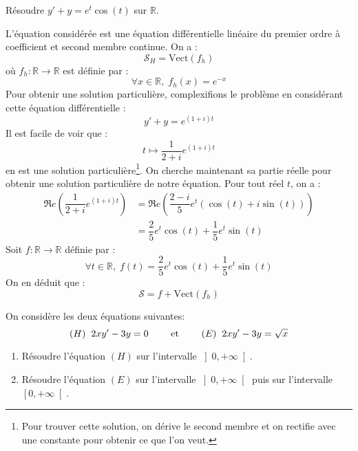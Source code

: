\documentclass[a4paper,10pt]{report}
\begin{document}
\begin{Exa} Résoudre $y'+y = e^t \cos(t)$ sur $\mathbb{R}$.
\end{Exa}

\corr L'équation considérée est une équation différentielle linéaire du premier ordre à coefficient et second membre continue. On a :
$$ \mathcal{S}_H = \textrm{Vect}(f_h)$$
où $f_h : \mathbb{R} \rightarrow \mathbb{R}$ est définie par :
$$ \forall x \in \mathbb{R}, \; f_h(x) = e^{-x}$$
Pour obtenir une solution particulière, \og complexifions \fg{} le problème en considérant cette équation différentielle :
$$ y'+y = e^{(1+i)t}$$
Il est facile de voir que :
$$ t \mapsto \dfrac{1}{2+i} e^{(1+i)t}$$
en est une solution particulière\footnote{Pour trouver cette solution, on dérive le second membre et on rectifie avec une constante pour obtenir ce que l'on veut.}. On cherche maintenant sa partie réelle pour obtenir une solution particulière de notre équation. Pour tout réel $t$, on a :
\begin{align*}
\Re e \left(\dfrac{1}{2+i} e^{(1+i)t} \right) & = \Re e \left(\dfrac{2-i}{5} e^t (\cos(t) + i \sin(t)) \right) \\
& = \dfrac{2}{5} e^t \cos(t) + \dfrac{1}{5} e^t \sin(t) 
\end{align*}
Soit $f : \mathbb{R} \rightarrow \mathbb{R}$ définie par :
$$ \forall t \in \mathbb{R}, \; f(t) = \dfrac{2}{5} e^t \cos(t) + \dfrac{1}{5} e^t \sin(t) $$
On en déduit que :
$$ \mathcal{S} = f +  \textrm{Vect}(f_h)$$

\begin{Exa} On considère les deux équations suivantes:\\
$$ (H) \; \;  2xy'-3y=0  \qquad \hbox{ et } \qquad (E) \; \; 2xy'-3y=\sqrt{x} $$

\begin{enumerate}
\item Résoudre l'équation $(H)$ sur l'intervalle $\left]  0,+\infty\right[ $.
\item Résoudre l'équation $(E)$ sur l'intervalle $\left]  0,+\infty\right[   $ puis sur l'intervalle $\left[ 0,+\infty\right[ $.
\end{enumerate}
\end{Exa}
\end{document}
